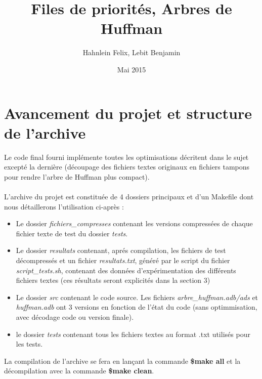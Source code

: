\documentclass[a4paper,11pt]{article}
\title{Files de priorités, Arbres de Huffman}
\author{Hahnlein Felix, Lebit Benjamin}
\date{Mai 2015}
\begin{document}
\maketitle

\section{Avancement du projet et structure de l'archive}
Le code final fourni implémente toutes les optimisations décritent dans le sujet excepté la dernière (découpage des fichiers textes originaux en fichiers tampons pour rendre l'arbre de Huffman plus compact). \\\\
L'archive du projet est constituée de 4 dossiers principaux et d'un Makefile dont nous détaillerons l'utilisation ci-après :
\begin{itemize}
\item Le dossier \textit{fichiers\_compresses} contenant les versions compressées de chaque fichier texte de test du dossier \textit{tests}.
\item Le dossier \textit{resultats} contenant, aprés compilation, les fichiers de test décompressés et un fichier \textit{resultats.txt}, généré par le script du fichier\textit{ script\_tests.sh}, contenant des données d'expérimentation des différents fichiers textes (ces résultats seront explicités dans la section 3)
\item Le dossier \textit{src} contenant le code source. Les fichiers \textit{arbre\_huffman.adb/ads} et \textit{huffman.adb} ont 3 versions en fonction de l'état du code (sans optimmisation, avec décodage code ou version finale).
\item le dossier \textit{tests} contenant tous les fichiers textes au format .txt utilisés pour les tests.
\end{itemize}
La compilation de l'archive se fera en lançant la commande \scriptsize{\textbf{\$make all}} \normalsize{ et la décompilation avec la commande }\scriptsize{\textbf{\$make clean}}. \\
\end{document}
